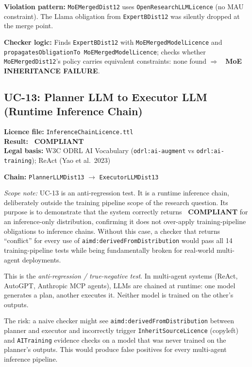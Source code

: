 \documentclass[12pt,a4paper]{article}
\newcommand{\compliant}{\textcolor{compliant}{\textbf{\checkmark\ COMPLIANT}}}
\newcommand{\violated}[1]{\textcolor{violation}{\textbf{\texttimes\ #1}}}
\begin{document}
\textbf{Violation pattern:} \texttt{MoEMergedDist12} uses \texttt{OpenResearchLLMLicence} (no MAU constraint). The Llama obligation from \texttt{ExpertBDist12} was silently dropped at the merge point.

\textbf{Checker logic:} Finds \texttt{ExpertBDist12} with \texttt{MoEMergedModelLicence} and \linebreak\texttt{propagatesObligationTo MoEMergedModelLicence}; checks whether \texttt{MoEMergedDist12}'s policy carries equivalent constraints: none found $\Rightarrow$ \violated{MoE INHERITANCE FAILURE}.

\subsection{UC-13: Planner LLM to Executor LLM (Runtime Inference Chain)}
\textbf{Licence file:} \texttt{InferenceChainLicence.ttl}\\[2pt]
\textbf{Result:} \compliant\\[4pt]
\textbf{Legal basis:} W3C ODRL AI Vocabulary (\texttt{odrl:ai-augment} vs \texttt{odrl:ai-training}); ReAct (Yao et al.\ 2023)

\textbf{Chain:} \texttt{PlannerLLMDist13} $\rightarrow$ \texttt{ExecutorLLMDist13}

\textit{Scope note:} UC-13 is an anti-regression test. It is a runtime inference chain, deliberately outside the training pipeline scope of the research question. Its purpose is to demonstrate that the system correctly returns \compliant{} for an inference-only distribution, confirming it does not over-apply training-pipeline obligations to inference chains. Without this case, a checker that returns ``conflict'' for every use of \texttt{aimd:derivedFromDistribution} would pass all 14 training-pipeline tests while being fundamentally broken for real-world multi-agent deployments.

This is the \emph{anti-regression / true-negative test}. In multi-agent systems (ReAct, AutoGPT, Anthropic MCP agents), LLMs are chained at runtime: one model generates a plan, another executes it. Neither model is trained on the other's outputs.

The risk: a naive checker might see \texttt{aimd:derivedFromDistribution} between planner and executor and incorrectly trigger \texttt{InheritSourceLicence} (copyleft) and \texttt{AITraining} evidence checks on a model that was never trained on the planner's outputs. This would produce false positives for every multi-agent inference pipeline.
\end{document}
